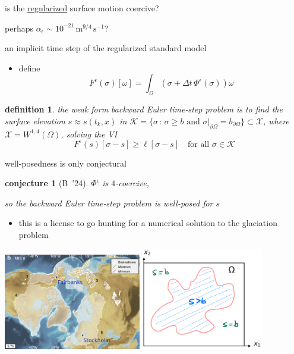 \documentclass[10pt,svgnames]{beamer}
\newtheorem*{defn}{definition}
\newtheorem*{conjecture}{conjecture}
\newcommand{\cK}{\mathcal{K}}
\newcommand{\cX}{\mathcal{X}}
\newcommand{\eps}{\epsilon}
\newcommand{\aler}[1]{{\color{FireBrick} #1}}
\begin{document}
\begin{frame}{is the \underline{regularized} surface motion coercive?}
\begin{itemize}
{\item perhaps $\alpha_\eps \sim 10^{-21} \,\text{m}^{9/4}\,\text{s}^{-1}$?

\vspace{19mm}
}
\end{itemize}
\end{frame}


\begin{frame}{an implicit time step of the regularized standard model}

\begin{itemize}
\item define
    $$F^\eps(\sigma)[\omega] = \int_\Omega \left(\sigma + \Delta t\,\Phi^\eps(\sigma)\right) \omega$$
\end{itemize}

\begin{defn}
the weak form \aler{backward Euler time-step problem} is to find the surface elevation $s \approx s(t_k,x)$ in $\cK =\{\sigma\,:\, \sigma \ge b \text{ and } \sigma|_{\partial\Omega} = b_{\partial\Omega}\} \subset \cX$, where $\cX = W^{1,4}(\Omega)$, solving the VI
$$F^\eps(s)[\sigma-s] \ge \ell[\sigma-s] \quad \text{for all } \sigma \in \cK$$
\end{defn}
\end{frame}


\begin{frame}{well-posedness is only conjectural}

\begin{conjecture}[B~'24]
$\Phi^\eps$ is $4$-coercive,

so the backward Euler time-step problem is well-posed for $s$
\end{conjecture}

\smallskip
\begin{itemize}
\item this is a license to go hunting for a numerical solution to the glaciation problem
\end{itemize}

\includegraphics[width=0.45\textwidth]{nhsheets} \hfill \includegraphics[width=0.4\textwidth]{mapplane}
\end{frame}
\end{document}
